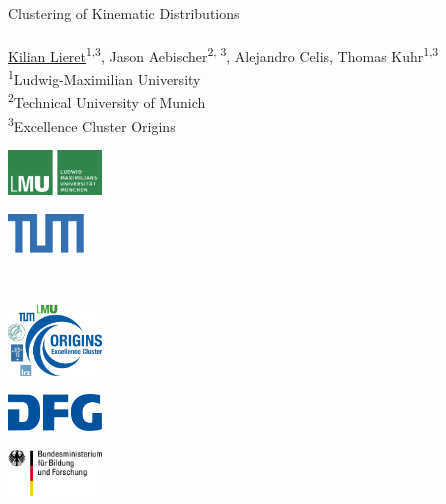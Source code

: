 \begin{frame}{}
	\begin{center}
		{
			{
				\Large Clustering of Kinematic Distributions
			}\\[0.7ex]
			{
				\large \insertsubtitle
			}
		}\\[2ex]
	    \underline{Kilian Lieret}\textsuperscript{1,3}, Jason Aebischer\textsuperscript{2, 3}, Alejandro Celis, Thomas Kuhr\textsuperscript{1,3}\\[2ex]
		{
			\footnotesize
			\textsuperscript{1}Ludwig-Maximilian University\\[0ex]
			\textsuperscript{2}Technical University of Munich\\[0ex]
			\vspace{-1ex}\textsuperscript{3}Excellence Cluster Origins
		}\\[2.5ex]
		\insertdate
	\end{center}
	\vspace{2ex}
	\centering
	{
		\begin{minipage}{3cm}
		\includegraphics[width=2.5cm]{figures/logos/lmu_logo.pdf}
		\end{minipage}
	}
	{
		\begin{minipage}{3cm}
			\includegraphics[width=2.0cm]{figures/logos/tum.pdf}
		\end{minipage}
	}\\[2ex]
	{
		\begin{minipage}{3cm}
			\includegraphics[width=2.5cm]{figures/logos/cluster.pdf}
		\end{minipage}
	}%
	{
		\begin{minipage}{3cm}
			\includegraphics[width=2.5cm]{figures/logos/dfg.pdf}
		\end{minipage}
	}
	{
		\begin{minipage}{3cm}
			\includegraphics[width=2.5cm]{figures/logos/bmbf.pdf}
		\end{minipage}
	}
\end{frame}
